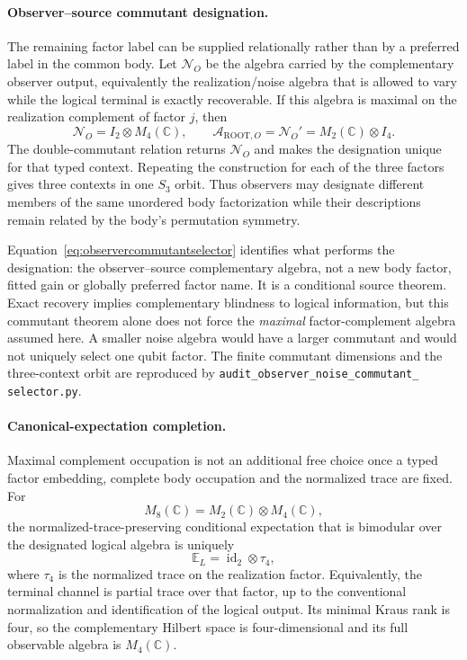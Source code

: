 \paragraph{Observer--source commutant designation.}
The remaining factor label can be supplied relationally rather than by a
preferred label in the common body. Let $\mathcal N_O$ be the algebra carried
by the complementary observer output, equivalently the realization/noise
algebra that is allowed to vary while the logical terminal is exactly
recoverable. If this algebra is maximal on the realization complement of
factor $j$, then
\begin{equation}
 \mathcal N_O=I_2\otimes M_4(\mathbb C),\qquad
 \mathcal A_{\mathrm{ROOT},O}=\mathcal N_O'=M_2(\mathbb C)\otimes I_4.
 \label{eq:observercommutantselector}
\end{equation}
The double-commutant relation returns $\mathcal N_O$ and makes the designation
unique for that typed context. Repeating the construction for each of the
three factors gives three contexts in one $S_3$ orbit. Thus observers may
designate different members of the same unordered body factorization while
their descriptions remain related by the body's permutation symmetry.

Equation~\eqref{eq:observercommutantselector} identifies what performs the
designation: the observer--source complementary algebra, not a new body
factor, fitted gain or globally preferred factor name. It is a conditional
source theorem. Exact recovery implies complementary blindness to logical
information, but this commutant theorem alone does not force the
\emph{maximal} factor-complement algebra assumed here. A smaller
noise algebra would have a larger commutant and would not uniquely select one
qubit factor. The finite commutant dimensions and the three-context orbit are
reproduced by
\texttt{audit\_observer\_noise\_commutant\_}\allowbreak
\texttt{selector.py}.

\paragraph{Canonical-expectation completion.}
Maximal complement occupation is not an additional free choice once a typed
factor embedding, complete body occupation and the normalized trace are
fixed. For
\begin{equation}
 M_8(\mathbb C)=M_2(\mathbb C)\otimes M_4(\mathbb C),
\end{equation}
the normalized-trace-preserving conditional expectation that is bimodular
over the designated logical algebra is uniquely
\begin{equation}
 \mathbb E_L=\operatorname{id}_2\otimes\tau_4,
 \label{eq:canonicalexpectation}
\end{equation}
where $\tau_4$ is the normalized trace on the realization factor. Equivalently,
the terminal channel is partial trace over that factor, up to the conventional
normalization and identification of the logical output. Its minimal Kraus
rank is four, so the complementary Hilbert space is four-dimensional and its
full observable algebra is $M_4(\mathbb C)$.

